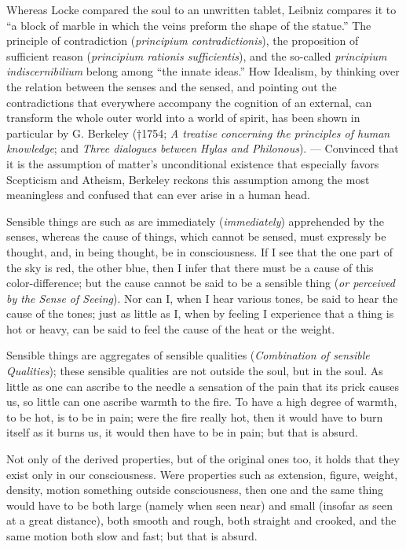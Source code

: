 \documentclass[12pt]{book}
\begin{document}
Whereas Locke compared the soul to an unwritten tablet, Leibniz compares it to
``a block of marble in which the veins preform the shape of the statue.'' The
principle of contradiction (\textit{principium contradictionis}), the proposition
of sufficient reason (\textit{principium rationis sufficientis}), and the
so-called \textit{principium indiscernibilium} belong among ``the innate ideas.''
How Idealism, by thinking over the relation between the senses and the sensed, and
pointing out the contradictions that everywhere accompany the cognition of an
external, can transform the whole outer world into a world of spirit, has been
shown in particular by G. Berkeley (†1754; \textit{A treatise concerning the
principles of human knowledge}; and \textit{Three dialogues between Hylas and
Philonous}). --- Convinced that it is the assumption of matter's unconditional
existence that especially favors Scepticism and Atheism, Berkeley reckons this
assumption among the most meaningless and confused that can ever arise in a human
head.

Sensible things are such as are immediately (\textit{immediately}) apprehended by
the senses, whereas the cause of things, which cannot be sensed, must expressly be
thought, and, in being thought, be in consciousness. If I see that the one part of
the sky is red, the other blue, then I infer that there must be a cause of this
color-difference; but the cause cannot be said to be a sensible thing (\textit{or
perceived by the Sense of Seeing}). Nor can I, when I hear various tones, be said
to hear the cause of the tones; just as little as I, when by feeling I experience
that a thing is hot or heavy, can be said to feel the cause of the heat or the
weight.

Sensible things are aggregates of sensible qualities (\textit{Combination of
sensible Qualities}); these sensible qualities are not outside the soul, but in
the soul. As little as one can ascribe to the needle a sensation of the pain that
its prick causes us, so little can one ascribe warmth to the fire. To have a high
degree of warmth, to be hot, is to be in pain; were the fire really hot, then it
would have to burn itself as it burns us, it would then have to be in pain; but
that is absurd.

Not only of the derived properties, but of the original ones too, it holds that
they exist only in our consciousness. Were properties such as extension, figure,
weight, density,
motion something outside consciousness, then one and the same thing would have to
be both large (namely when seen near) and small (insofar as seen at a great
distance), both smooth and rough, both straight and crooked, and the same motion
both slow and fast; but that is absurd.
\end{document}
